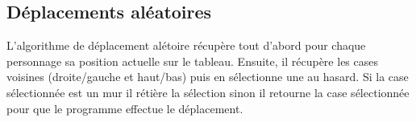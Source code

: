 \subsection{Déplacements aléatoires}

L'algorithme de déplacement alétoire récupère tout d'abord pour chaque personnage sa position actuelle sur le tableau. Ensuite, il récupère les cases voisines (droite/gauche et haut/bas) puis en sélectionne une au hasard. Si la case sélectionnée est un mur il rétière la sélection sinon il retourne la case sélectionnée pour que le programme effectue le déplacement.